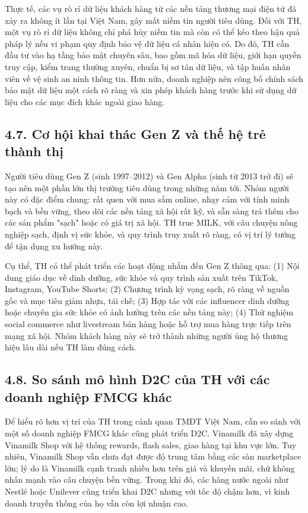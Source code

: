 Thực tế, các vụ rò rỉ dữ liệu khách hàng từ các nền tảng thương mại điện tử đã xảy ra không ít lần tại Việt Nam, gây mất niềm tin người tiêu dùng. Đối với TH, một vụ rò rỉ dữ liệu không chỉ phá hủy niềm tin mà còn có thể kéo theo hậu quả pháp lý nếu vi phạm quy định bảo vệ dữ liệu cá nhân hiện có. Do đó, TH cần đầu tư vào hạ tầng bảo mật chuyên sâu, bao gồm mã hóa dữ liệu, giới hạn quyền truy cập, kiểm trang thường xuyên, chuẩn bị sơ tán dữ liệu, và tập huấn nhân viên về vệ sinh an ninh thông tin. Hơn nữa, doanh nghiệp nên công bố chính sách bảo mật dữ liệu một cách rõ ràng và xin phép khách hàng trước khi sử dụng dữ liệu cho các mục đích khác ngoài giao hàng.

\subsection*{4.7. Cơ hội khai thác Gen Z và thế hệ trẻ thành thị}
Người tiêu dùng Gen Z (sinh 1997--2012) và Gen Alpha (sinh từ 2013 trở đi) sẽ tạo nên một phần lớn thị trường tiêu dùng trong những năm tới. Nhóm người này có đặc điểm chung: rất quen với mua sắm online, nhạy cảm với tính minh bạch và bền vững, theo dõi các nền tảng xã hội rất kỹ, và sẵn sàng trả thêm cho các sản phẩm "sạch" hoặc có giá trị xã hội. TH true MILK, với câu chuyện nông nghiệp sạch, định vị sức khỏe, và quy trình truy xuất rõ ràng, có vị trí lý tưởng để tận dụng xu hướng này.

Cụ thể, TH có thể phát triển các hoạt động nhắm đến Gen Z thông qua: (1) Nội dung giáo dục về dinh dưỡng, sức khỏe và quy trình sản xuất trên TikTok, Instagram, YouTube Shorts; (2) Chương trình kỳ vọng sạch, rõ ràng về nguồn gốc và mục tiêu giảm nhựa, tái chế; (3) Hợp tác với các influencer dinh dưỡng hoặc chuyên gia sức khỏe có ảnh hưởng trên các nền tảng này; (4) Thử nghiệm social commerce như livestream bán hàng hoặc hỗ trợ mua hàng trực tiếp trên mạng xã hội. Nhóm khách hàng này sẽ trở thành những người ủng hộ thương hiệu lâu dài nếu TH làm đúng cách.

\subsection*{4.8. So sánh mô hình D2C của TH với các doanh nghiệp FMCG khác}
Để hiểu rõ hơn vị trí của TH trong cảnh quan TMĐT Việt Nam, cần so sánh với một số doanh nghiệp FMCG khác cũng phát triển D2C. Vinamilk đã xây dựng Vinamilk Shop với hệ thống rewards, flash sales, giao hàng tại khu vực lớn. Tuy nhiên, Vinamilk Shop vẫn chưa đạt được độ trung tâm bằng các sàn marketplace lớn; lý do là Vinamilk cạnh tranh nhiều hơn trên giá và khuyến mãi, chứ không nhấn mạnh vào câu chuyện bền vững. Trong khi đó, các hãng nước ngoài như Nestlé hoặc Unilever cũng triển khai D2C nhưng với tốc độ chậm hơn, vì kinh doanh truyền thống của họ vẫn còn lợi nhuận cao.

